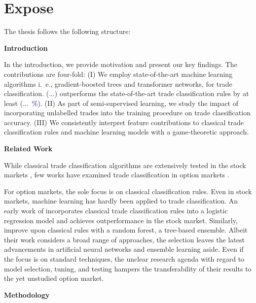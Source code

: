 \section{Expose}
\label{sec:expose}

The thesis follows the following structure:

\textbf{Introduction}

In the introduction, we provide motivation and present our key findings. The contributions are four-fold: (I) We employ state-of-the-art machine learning algorithms i.~e., gradient-boosted trees and transformer networks, for trade classification. \textcolor{darkblue}{(...)} outperforms the state-of-the-art trade classification rules by at least \textcolor{darkblue}{(...~\%)}. (II) As part of semi-supervised learning, we study the impact of incorporating unlabelled trades into the training procedure on trade classification accuracy. (III) We consistently interpret feature contributions to classical trade classification rules and machine learning models with a game-theoretic approach.

\textbf{Related Work}

While classical trade classification algorithms are extensively tested in the stock markets \autocites[e.~g.,][]{chakrabartyTradeClassificationAlgorithms2012}{odders-whiteOccurrenceConsequencesInaccurate2000}, few works have examined trade classification in option markets \autocites{grauerOptionTradeClassification2022}{savickasInferringDirectionOption2003}.

For option markets, the sole focus is on classical classification rules. Even in stock markets, machine learning has hardly been applied to trade classification. An early work of \textcite{rosenthalModelingTradeDirection2012} incorporates classical trade classification rules into a logistic regression model and achieves outperformance in the stock market. Similarly, \textcites{fedeniaMachineLearningCorporate2021}{ronenMachineLearningTrade2022} improve upon classical rules with a random forest, a tree-based ensemble. Albeit their work considers a broad range of approaches, the selection leaves the latest advancements in artificial neural networks and ensemble learning aside. Even if the focus is on standard techniques, the unclear research agenda with regard to model selection, tuning, and testing hampers the transferability of their results to the yet unstudied option market. 

\textbf{Methodology}

